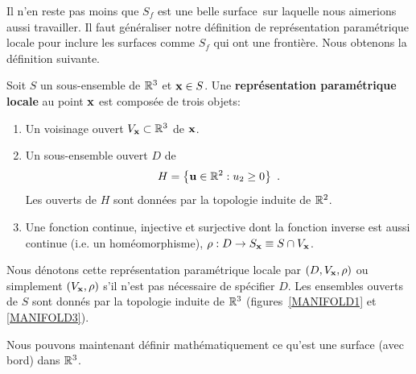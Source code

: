 {

Il n'en reste pas moins que $S_f$ est une \flqq belle surface\frqq\
sur laquelle nous aimerions aussi travailler.  Il faut généraliser notre
définition de représentation paramétrique locale pour inclure les
surfaces comme $S_f$ qui ont une frontière.  Nous obtenons la définition
suivante.

\begin{defn} 
Soit $S$ un sous-ensemble de $\mathbb{R}^3$ et $\mathbf{x} \in S$.  Une
{\bfseries représentation paramétrique locale} au point $\mathbf{x}$ est
composée de trois objets:
\begin{enumerate}
\item Un voisinage ouvert $V_{\mathbf{x}} \subset \mathbb{R}^3$ de $\mathbf{x}$.
\item Un sous-ensemble ouvert $D$ de
\[
H = \left\{ \mathbf{u} \in \mathbb{R}^2 : u_2 \geq 0 \right\} \ .
\]
Les ouverts de $H$ sont données par la topologie induite de $\mathbb{R}^2$.
\item Une fonction continue, injective et surjective dont la fonction inverse
est aussi continue (i.e. un homéomorphisme),
$\rho:D\rightarrow S_{\mathbf{x}} \equiv S \cap V_{\mathbf{x}}$.
\end{enumerate}
Nous dénotons cette représentation paramétrique locale par
$(D,V_{\mathbf{x}},\rho)$ ou simplement $(V_{\mathbf{x}},\rho)$ s'il n'est
pas nécessaire de spécifier $D$.  Les ensembles ouverts de $S$ sont donnés par
la topologie induite de $\mathbb{R}^3$ (figures~\ref{MANIFOLD1} et
\ref{MANIFOLD3}).
\end{defn}


Nous pouvons maintenant définir mathématiquement ce qu'est une surface
(avec bord) dans $\mathbb{R}^3$.

}
